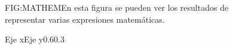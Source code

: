 \begin{figure}[Representaciión de expresiones matemáticas]{FIG:MATHEM}{En esta figura se pueden ver los resultados de representar varias expresiones matemáticas.}
    \begin{xyplot}{}{Eje x}{Eje y}{0.6\textwidth}{0.3\textheight}
    \end{xyplot}
  \end{figure}

%
%

